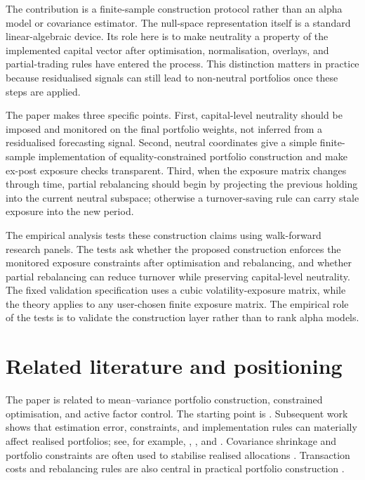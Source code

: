 \documentclass[11pt]{article}
\begin{document}
The contribution is a finite-sample construction protocol rather than an alpha model or covariance
estimator.  The null-space representation itself is a standard linear-algebraic device.  Its role here is to
make neutrality a property of the implemented capital vector after optimisation, normalisation, overlays,
and partial-trading rules have entered the process.  This distinction matters in practice because
residualised signals can still lead to non-neutral portfolios once these steps are applied.

The paper makes three specific points.  First, capital-level neutrality should be imposed and monitored
on the final portfolio weights, not inferred from a residualised forecasting signal.  Second, neutral
coordinates give a simple finite-sample implementation of equality-constrained portfolio construction
and make ex-post exposure checks transparent.  Third, when the exposure matrix changes through time,
partial rebalancing should begin by projecting the previous holding into the current neutral subspace;
otherwise a turnover-saving rule can carry stale exposure into the new period.

The empirical analysis tests these construction claims using walk-forward research panels.  The tests ask
whether the proposed construction enforces the monitored exposure constraints after optimisation and
rebalancing, and whether partial rebalancing can reduce turnover while preserving capital-level
neutrality.  The fixed validation specification uses a cubic volatility-exposure matrix, while the theory
applies to any user-chosen finite exposure matrix.  The empirical role of the tests is to validate the
construction layer rather than to rank alpha models.

\section{Related literature and positioning}

The paper is related to mean--variance portfolio construction, constrained optimisation, and active factor
control.  The starting point is \citet{Markowitz1952}.  Subsequent work shows that estimation error,
constraints, and implementation rules can materially affect realised portfolios; see, for example,
\citet{Michaud1989}, \citet{DeMiguel2009}, and \citet{Kolm2014}.  Covariance shrinkage and portfolio
constraints are often used to stabilise realised allocations
\citep{LedoitWolf2004,JagannathanMa2003}.  Transaction costs and rebalancing rules are also central in
practical portfolio construction \citep{Lobo2007,Boyd2017}.
\end{document}
